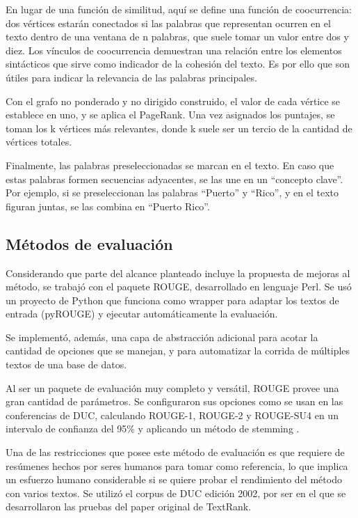 \documentclass[a4paper]{article}
\begin{document}
En lugar de una función de similitud, aquí se define una función de coocurrencia: dos vértices estarán conectados si las palabras que representan ocurren en el texto dentro de una ventana de n palabras, que suele tomar un valor entre dos y diez. Los vínculos de coocurrencia demuestran una relación entre los elementos sintácticos que sirve como indicador de la cohesión del texto. Es por ello que son útiles para indicar la relevancia de las palabras principales.

Con el grafo no ponderado y no dirigido construido, el valor de cada vértice se establece en uno, y se aplica el PageRank. Una vez asignados los puntajes, se toman los k vértices más relevantes, donde k suele ser un tercio de la cantidad de vértices totales. 

Finalmente, las palabras preseleccionadas se marcan en el texto. En caso que estas palabras formen secuencias adyacentes, se las une en un “concepto clave”. Por ejemplo, si se preseleccionan las palabras “Puerto” y “Rico”, y en el texto figuran juntas, se las combina en “Puerto Rico”.


\subsection{Métodos de evaluación}
Considerando que parte del alcance planteado incluye la propuesta de mejoras al método, se trabajó con el paquete ROUGE, desarrollado en lenguaje Perl. Se usó un proyecto de Python que funciona como wrapper para adaptar los textos de entrada (pyROUGE) y ejecutar automáticamente la evaluación. 

Se implementó, además, una capa de abstracción adicional para acotar la cantidad de opciones que se manejan, y para automatizar la corrida de múltiples textos de una base de datos.

Al ser un paquete de evaluación muy completo y versátil, ROUGE provee una gran cantidad de parámetros. Se configuraron sus opciones como se usan en las conferencias de DUC, calculando ROUGE-1, ROUGE-2 y ROUGE-SU4 en un intervalo de confianza del 95\% y aplicando un método de stemming \cite{duc2007}. 

Una de las restricciones que posee este método de evaluación es que requiere de resúmenes hechos por seres humanos para tomar como referencia, lo que implica un esfuerzo humano considerable si se quiere probar el rendimiento del método con varios textos. Se utilizó el corpus de DUC edición 2002, por ser en el que se desarrollaron las pruebas del paper original de TextRank.
\end{document}
